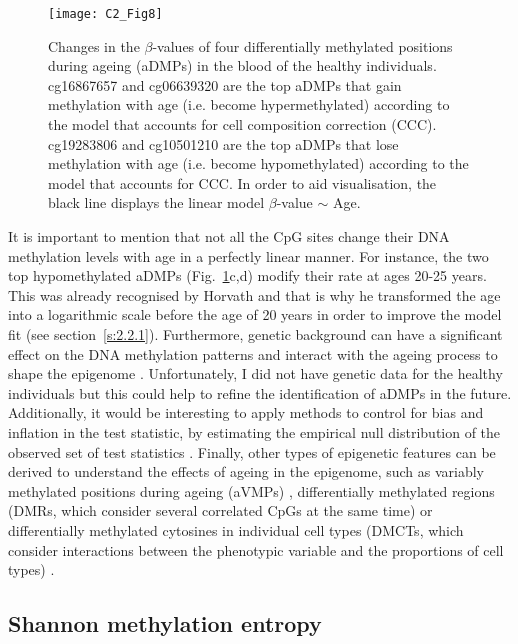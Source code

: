 \begin{figure}[htbp!] 
	\centering    
	\texttt{[image: C2\_Fig8]}
	\caption[Changes in the $\beta$-values of four different aDMPs]{Changes in the $\beta$-values of four differentially methylated positions during ageing (aDMPs) in the blood of the healthy individuals. cg16867657 and cg06639320 are the top aDMPs that gain methylation with age (i.e. become hypermethylated) according to the model that accounts for cell composition correction (CCC). cg19283806 and cg10501210 are the top aDMPs that lose methylation with age (i.e. become hypomethylated) according to the model that accounts for CCC. In order to aid visualisation, the black line displays the linear model $\beta$-value $\sim$ Age.}
	\label{fig:c2_fig8}
\end{figure}

\bigskip

It is important to mention that not all the CpG sites change their DNA methylation levels with age in a perfectly linear manner. For instance, the two top hypomethylated aDMPs (Fig.~\ref{fig:c2_fig8}c,d) modify their rate at ages 20-25 years. This was already recognised by Horvath \citep{Horvath2013} and that is why he transformed the age into a logarithmic scale before the age of 20 years in order to improve the model fit (see section~\ref{s:2.2.1}). Furthermore, genetic background can have a significant effect on the DNA methylation patterns and interact with the ageing process to shape the epigenome \citep{Hannum2013,VanDongen2016}. Unfortunately, I did not have genetic data for the healthy individuals but this could help to refine the identification of aDMPs in the future. Additionally, it would be interesting to apply methods to control for bias and inflation in the test statistic, by estimating the empirical null distribution of the observed set of test statistics \citep{VanIterson2017}. Finally, other types of epigenetic features can be derived to understand the effects of ageing in the epigenome, such as variably methylated positions during ageing (\acrshort{aVMPs}) \citep{Slieker2016}, differentially methylated regions (\acrshort{DMRs}, which consider several correlated CpGs at the same time) \citep{Teschendorff2018} or differentially methylated cytosines in individual cell types (\acrshort{DMCTs}, which consider interactions between the phenotypic variable and the proportions of cell types) \citep{Zheng2018}.


\smallskip

\subsection{Shannon methylation entropy} \label{s:2.1.5}

